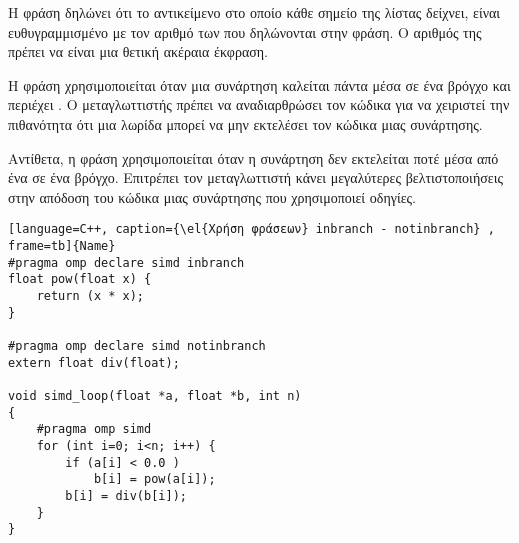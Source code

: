Η φράση  δηλώνει ότι το αντικείμενο στο οποίο κάθε σημείο της λίστας δείχνει, είναι ευθυγραμμισμένο με τον αριθμό των  που δηλώνονται στην φράση. Ο αριθμός της πρέπει να είναι μια θετική ακέραια έκφραση.

Η φράση \emph{} χρησιμοποιείται όταν μια συνάρτηση καλείται πάντα μέσα σε ένα \emph{} βρόγχο και
περιέχει \emph{}. Ο μεταγλωττιστής πρέπει να αναδιαρθρώσει τον κώδικα για να χειριστεί την πιθανότητα
ότι μια λωρίδα \emph{} μπορεί να μην εκτελέσει τον κώδικα μιας συνάρτησης.

Αντίθετα, η φράση \emph{} χρησιμοποιείται όταν η συνάρτηση δεν εκτελείται ποτέ μέσα από ένα \emph{} σε ένα \emph{} βρόγχο. Επιτρέπει τον μεταγλωττιστή κάνει μεγαλύτερες βελτιστοποιήσεις στην απόδοση
του κώδικα μιας συνάρτησης που χρησιμοποιεί \emph{} οδηγίες.
\begin{spacing}{0.8}
\begin{lstlisting}[language=C++, caption={\el{Χρήση φράσεων} inbranch - notinbranch} , frame=tb]{Name}
#pragma omp declare simd inbranch
float pow(float x) {
	return (x * x);
}

#pragma omp declare simd notinbranch
extern float div(float);

void simd_loop(float *a, float *b, int n)
{
	#pragma omp simd
	for (int i=0; i<n; i++) {
		if (a[i] < 0.0 )
			b[i] = pow(a[i]);
		b[i] = div(b[i]);
	}
}
\end{lstlisting}
\end{spacing}
